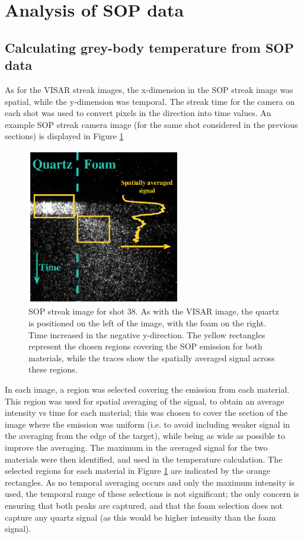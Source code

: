 \section{Analysis of SOP data} \label{SOP analysis}


\subsection{Calculating grey-body temperature from SOP data}
As for the VISAR streak images, the x-dimension in the SOP streak image was spatial, while the y-dimension was temporal. The streak time for the camera on each shot was used to convert pixels in the direction into time values. An example SOP streak camera image (for the same shot considered in the previous sections) is displayed in Figure \ref{fig:SOP data}

\begin{figure} [h]
\begin{centering}
\includegraphics[width=0.6\textwidth]{figures/Experiment/SOPImage.eps}%
\caption{\label{fig:SOP data} SOP streak image for shot 38. As with the VISAR image, the quartz is positioned on the left of the image, with the foam on the right. Time increased in the negative y-direction. The yellow rectangles represent the chosen regions covering the SOP emission for both materials, while the traces show the spatially averaged signal across these regions.}
\end{centering}
\end{figure}

In each image, a region was selected covering the emission from each material. This region was used for spatial averaging of the signal, to obtain an average intensity vs time for each material; this was chosen to cover the section of the image where the emission was uniform (i.e. to avoid including weaker signal in the averaging from the edge of the target), while being as wide as possible to improve the averaging. The maximum in the averaged signal for the two materials were then identified, and used in the temperature calculation. The selected regions for each material in Figure \ref{fig:SOP data} are indicated by the orange rectangles. As no temporal averaging occurs and only the maximum intensity is used, the temporal range of these selections is not significant; the only concern is ensuring that both peaks are captured, and that the foam selection does not capture any quartz signal (as this would be higher intensity than the foam signal).

